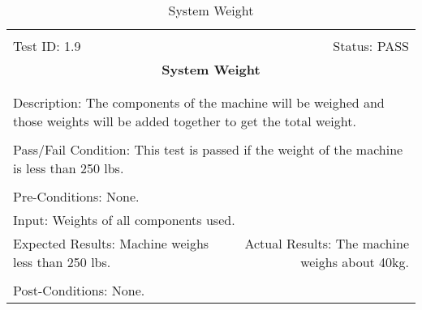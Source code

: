 \documentclass[titlepage]{article}
\begin{document}
\begin{center}
\begin{table}[h!]
\begin{tabular}{|l r|}\hline&\\[-2mm]
	Test ID: 1.9	&Status: PASS\\[-3mm]
	\multicolumn{2}{|c|}{\textbf{\large{System Weight}}}\\&\\\hline&\\[-3mm]
	\multicolumn{2}{|p{\textwidth}|}{Description: The components of the machine will be weighed and those weights will be added together to get the total weight.}\\[1mm]\hline&\\[-3mm]
	\multicolumn{2}{|p{\textwidth}|}{Pass/Fail Condition: This test is passed if the weight of the machine is less than 250 lbs.}\\[1mm]\hline&\\[-3mm]
	\multicolumn{2}{|p{\textwidth}|}{Pre-Conditions: None.}\\[4mm]
	\multicolumn{2}{|p{\textwidth}|}{Input: Weights of all components used.}\\[2mm]\hline
	\multicolumn{1}{|p{0.49\textwidth}}{Expected Results: Machine weighs less than 250 lbs.}	&\multicolumn{1}{|p{0.45\textwidth}|}{Actual Results: The machine weighs about 40kg.}\\\hline&\\[-3mm]
	\multicolumn{2}{|p{\textwidth}|}{Post-Conditions: None.}\\\hline
\end{tabular}
\caption{System Weight}
\end{table}
\end{center}
\end{document}
